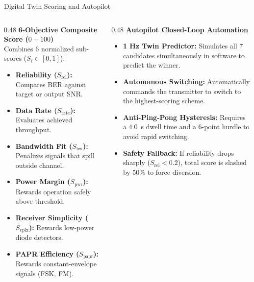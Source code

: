 \documentclass[aspectratio=169, 10pt]{beamer}
\begin{document}
\begin{frame}{Digital Twin Scoring and Autopilot}
  \begin{columns}[T]
    \begin{column}{0.48\linewidth}
      \textbf{\color{primaryblue}\normalsize 6-Objective Composite Score ($0-100$)}\\[0.10cm]
      Combines 6 normalized sub-scores ($S_i \in [0, 1]$):
      \begin{itemize}\setlength{\itemsep}{4pt}\small
        \item \textbf{Reliability ($S_{\text{rel}}$):} Compares BER against target or output SNR.
        \item \textbf{Data Rate ($S_{\text{rate}}$):} Evaluates achieved throughput.
        \item \textbf{Bandwidth Fit ($S_{\text{bw}}$):} Penalizes signals that spill outside channel.
        \item \textbf{Power Margin ($S_{\text{pwr}}$):} Rewards operation safely above threshold.
        \item \textbf{Receiver Simplicity ($S_{\text{cplx}}$):} Rewards low-power diode detectors.
        \item \textbf{PAPR Efficiency ($S_{\text{papr}}$):} Rewards constant-envelope signals (FSK, FM).
      \end{itemize}
    \end{column}
    
    \begin{column}{0.48\linewidth}
      \textbf{\color{primaryblue}\normalsize Autopilot Closed-Loop Automation}\\[0.10cm]
      \begin{itemize}\setlength{\itemsep}{6pt}\small
        \item \textbf{1 Hz Twin Predictor:} Simulates all 7 candidates simultaneously in software to predict the winner.
        \item \textbf{Autonomous Switching:} Automatically commands the transmitter to switch to the highest-scoring scheme.
        \item \textbf{Anti-Ping-Pong Hysteresis:} Requires a 4.0~s dwell time and a 6-point hurdle to avoid rapid switching.
        \item \textbf{Safety Fallback:} If reliability drops sharply ($S_{\text{rel}} < 0.2$), total score is slashed by 50\% to force diversion.
      \end{itemize}
    \end{column}
  \end{columns}
\end{frame}
\end{document}

